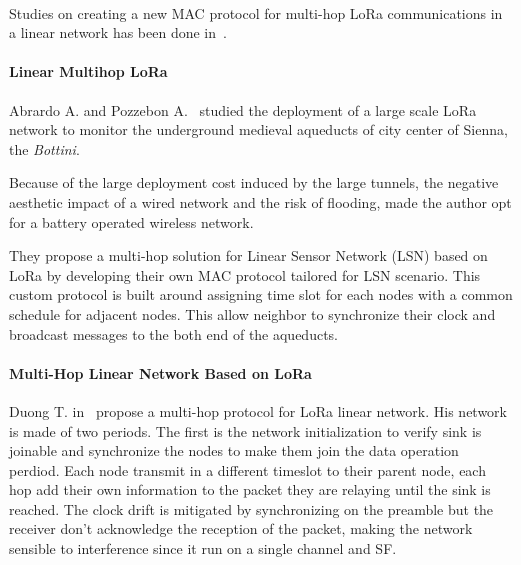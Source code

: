
\paragraph{}

Studies on creating a new MAC protocol for multi-hop LoRa communications in a linear
network has been done in~\cite{Abrardo_2019,duong2018}.

\paragraph{Linear Multihop LoRa}

Abrardo A. and Pozzebon A.~\cite{Abrardo_2019} studied the deployment of a
large scale LoRa network to monitor the underground medieval aqueducts of city center 
of Sienna, the \emph{Bottini}.

Because of the large deployment cost induced by the large tunnels, the negative 
aesthetic impact of a wired network and the risk of flooding, made the author
opt for a battery operated wireless network.

They propose a multi-hop solution for Linear Sensor Network (LSN) based on LoRa by
developing their own MAC protocol tailored for LSN scenario.
This custom protocol is built around assigning time slot for each nodes with
a common schedule for adjacent nodes.
This allow neighbor to synchronize their clock and broadcast messages to the
both end of the aqueducts.


\paragraph{Multi-Hop Linear Network Based on LoRa}

Duong T. in~\cite{duong2018} propose a multi-hop protocol for LoRa linear
network. 
His network is made of two periods. The first is the network initialization to
verify sink is joinable and synchronize the nodes to make them join the data
operation perdiod.
Each node transmit in a different timeslot to their parent node, each hop add
their own information to the packet they are relaying until the sink is
reached.
The clock drift is mitigated by synchronizing on the preamble but the receiver
don't acknowledge the reception of the packet, making the network sensible to
interference since it run on a single channel and SF.

